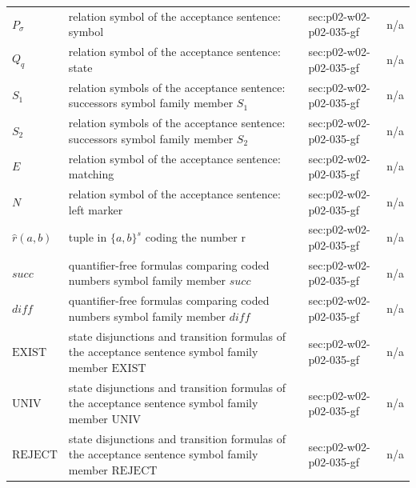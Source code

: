\begin{longtable}{@{}p{}p{}p{}p{}@{}}
\(P_\sigma\) & relation symbol of the acceptance sentence: symbol & sec:\allowbreak{}p02-\allowbreak{}w02-\allowbreak{}p02-\allowbreak{}035-\allowbreak{}gf & n/a \\
\(Q_q\) & relation symbol of the acceptance sentence: state & sec:\allowbreak{}p02-\allowbreak{}w02-\allowbreak{}p02-\allowbreak{}035-\allowbreak{}gf & n/a \\
\(S_1\) & relation symbols of the acceptance sentence: successors symbol family member \(S_1\) & sec:\allowbreak{}p02-\allowbreak{}w02-\allowbreak{}p02-\allowbreak{}035-\allowbreak{}gf & n/a \\
\(S_2\) & relation symbols of the acceptance sentence: successors symbol family member \(S_2\) & sec:\allowbreak{}p02-\allowbreak{}w02-\allowbreak{}p02-\allowbreak{}035-\allowbreak{}gf & n/a \\
\(E\) & relation symbol of the acceptance sentence: matching & sec:\allowbreak{}p02-\allowbreak{}w02-\allowbreak{}p02-\allowbreak{}035-\allowbreak{}gf & n/a \\
\(N\) & relation symbol of the acceptance sentence: left marker & sec:\allowbreak{}p02-\allowbreak{}w02-\allowbreak{}p02-\allowbreak{}035-\allowbreak{}gf & n/a \\
\(\hat r(a,\allowbreak b)\) & tuple in \(\{a,b\}^s\) coding the number r & sec:\allowbreak{}p02-\allowbreak{}w02-\allowbreak{}p02-\allowbreak{}035-\allowbreak{}gf & n/a \\
\(\mathit{succ}\) & quantifier-free formulas comparing coded numbers symbol family member \(\mathit{succ}\) & sec:\allowbreak{}p02-\allowbreak{}w02-\allowbreak{}p02-\allowbreak{}035-\allowbreak{}gf & n/a \\
\(\mathit{diff}\) & quantifier-free formulas comparing coded numbers symbol family member \(\mathit{diff}\) & sec:\allowbreak{}p02-\allowbreak{}w02-\allowbreak{}p02-\allowbreak{}035-\allowbreak{}gf & n/a \\
\(\mathrm{EXIST}\) & state disjunctions and transition formulas of the acceptance sentence symbol family member \(\mathrm{EXIST}\) & sec:\allowbreak{}p02-\allowbreak{}w02-\allowbreak{}p02-\allowbreak{}035-\allowbreak{}gf & n/a \\
\(\mathrm{UNIV}\) & state disjunctions and transition formulas of the acceptance sentence symbol family member \(\mathrm{UNIV}\) & sec:\allowbreak{}p02-\allowbreak{}w02-\allowbreak{}p02-\allowbreak{}035-\allowbreak{}gf & n/a \\
\(\mathrm{REJECT}\) & state disjunctions and transition formulas of the acceptance sentence symbol family member \(\mathrm{REJECT}\) & sec:\allowbreak{}p02-\allowbreak{}w02-\allowbreak{}p02-\allowbreak{}035-\allowbreak{}gf & n/a \\

\end{longtable}
